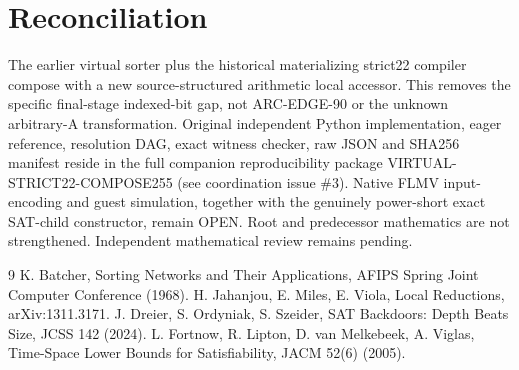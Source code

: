 \documentclass[11pt]{article}
\begin{document}
\section{Reconciliation}
The earlier virtual sorter plus the historical materializing strict22 compiler compose with a new source-structured arithmetic local accessor. This removes the specific final-stage indexed-bit gap, not ARC-EDGE-90 or the unknown arbitrary-A transformation. Original independent Python implementation, eager reference, resolution DAG, exact witness checker, raw JSON and SHA256 manifest reside in the full companion reproducibility package VIRTUAL-STRICT22-COMPOSE255 (see coordination issue \#3). Native FLMV input-encoding and guest simulation, together with the genuinely power-short exact SAT-child constructor, remain OPEN. Root and predecessor mathematics are not strengthened. Independent mathematical review remains pending.
\begin{thebibliography}{9}
 K. Batcher, Sorting Networks and Their Applications, AFIPS Spring Joint Computer Conference (1968).
 H. Jahanjou, E. Miles, E. Viola, Local Reductions, arXiv:1311.3171.
 J. Dreier, S. Ordyniak, S. Szeider, SAT Backdoors: Depth Beats Size, JCSS 142 (2024).
 L. Fortnow, R. Lipton, D. van Melkebeek, A. Viglas, Time-Space Lower Bounds for Satisfiability, JACM 52(6) (2005).
\end{thebibliography}
\end{document}
